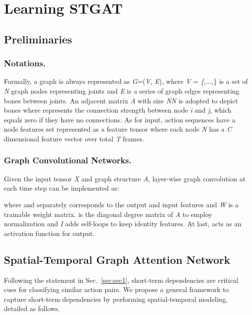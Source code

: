 \documentclass[runningheads]{llncs}
\begin{document}
\section{Learning STGAT}
\subsection{Preliminaries}
\subsubsection{Notations.}
Formally, a graph is always represented as \textit{G}=(\textit{V}, \textit{E}), where \textit{V} = \textit\{,...,\} is a set of \textit{N} graph nodes representing joints and \textit{E} is a series of graph edges representing bones between joints. An adjacent matrix \textit{A} with size \textit{N}\textit{N} is adopted to depict bones where  represents the connection strength between node \textit{i} and \textit{j}, which equals zero if they have no connections. As for input, action sequences have a node features set represented as a feature tensor  where each node  \textit{N} has a \textit{C} dimensional feature vector over total \textit{T} frames.
\subsubsection{Graph Convolutional Networks.}
Given the input tensor \textit{X} and graph structure \textit{A}, layer-wise graph convolution at each time step can be implemented as:
    
where  and  separately corresponds to the output and input features and \textit{W} is a trainable weight matrix. \iffalse Only 1-hop neighbors of \textit{A} have the same normalized non-zero value.\fi  is the diagonal degree matrix of \textit{A} to employ normalization and \textit{I} adds self-loops to keep identity features. At last,  acts as an activation function for output. 
  
\subsection{Spatial-Temporal Graph Attention Network}
Following the statement in Sec.~\ref{sec:sec1}, short-term dependencies are critical cues for classifying similar action pairs. We propose a general framework to capture short-term dependencies by performing spatial-temporal modeling, detailed as follows.
  
\end{document}
